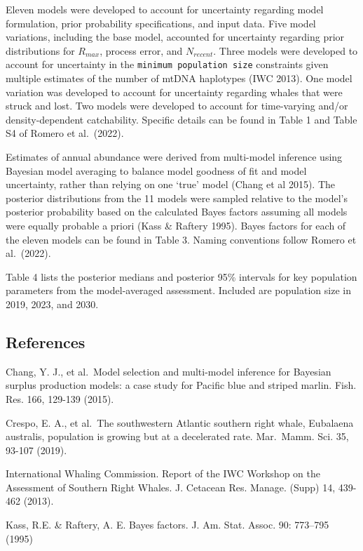 \documentclass[
]{article}
\begin{document}
Eleven models were developed to account for uncertainty regarding model
formulation, prior probability specifications, and input data. Five
model variations, including the base model, accounted for uncertainty
regarding prior distributions for \(R_{max}\), process error, and
\(N_{recent}\). Three models were developed to account for uncertainty
in the \texttt{minimum\ population\ size} constraints given multiple
estimates of the number of mtDNA haplotypes (IWC 2013). One model
variation was developed to account for uncertainty regarding whales that
were struck and lost. Two models were developed to account for
time-varying and/or density-dependent catchability. Specific details can
be found in Table 1 and Table S4 of Romero et al.~(2022).

Estimates of annual abundance were derived from multi-model inference
using Bayesian model averaging to balance model goodness of fit and
model uncertainty, rather than relying on one `true' model (Chang et al
2015). The posterior distributions from the 11 models were sampled
relative to the model's posterior probability based on the calculated
Bayes factors assuming all models were equally probable a priori (Kass
\& Raftery 1995). Bayes factors for each of the eleven models can be
found in Table 3. Naming conventions follow Romero et al.~(2022).

Table 4 lists the posterior medians and posterior 95\% intervals for key
population parameters from the model-averaged assessment. Included are
population size in 2019, 2023, and 2030.

\hypertarget{references}{%
\subsection{References}\label{references}}

Chang, Y. J., et al.~Model selection and multi-model inference for
Bayesian surplus production models: a case study for Pacific blue and
striped marlin. Fish. Res. 166, 129-139 (2015).

Crespo, E. A., et al.~The southwestern Atlantic southern right whale,
Eubalaena australis, population is growing but at a decelerated rate.
Mar.~Mamm. Sci. 35, 93-107 (2019).

International Whaling Commission. Report of the IWC Workshop on the
Assessment of Southern Right Whales. J. Cetacean Res. Manage. (Supp) 14,
439-462 (2013).

Kass, R.E. \& Raftery, A. E. Bayes factors. J. Am. Stat. Assoc. 90:
773--795 (1995)
\end{document}
